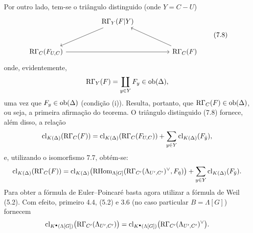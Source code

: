 Por outro lado, tem-se o triângulo distinguido (onde $Y=C-U$)
\[
\begin{tikzcd}[column sep=huge,row sep=large]
& \RG_Y(F|Y) \arrow[dl] & \\
\RG_C(F_{U,C}) \arrow[rr] && \RG_C(F) \arrow[ul]
\end{tikzcd}
\tag{7.8}
\]
onde, evidentemente,
\[
\mathrm{R}\Gamma_Y(F)=\coprod_{y\in Y}F_y\in\operatorname{ob}(\Delta),
\]
uma vez que $F_y\in\operatorname{ob}(\Delta)$ (condição (i)). Resulta, portanto, que $\mathrm{R}\Gamma_C(F)\in\operatorname{ob}(\Delta)$, ou seja, a primeira afirmação do teorema. O triângulo distinguido (7.8) fornece, além disso, a relação
\[
\operatorname{cl}_{K(\Delta)}(\mathrm{R}\Gamma_C(F))
=
\operatorname{cl}_{K(\Delta)}(\mathrm{R}\Gamma_C(F_{U,C}))
+\sum_{y\in Y}\operatorname{cl}_{K(\Delta)}(F_{\bar y}),
\]
e, utilizando o isomorfismo 7.7, obtém-se:
\[
\operatorname{cl}_{K(\Delta)}(\mathrm{R}\Gamma_C(F))
=
\operatorname{cl}_{K(\Delta)}\bigl(\mathrm{RHom}_{\Lambda[G]}(\mathrm{R}\Gamma_{C'}(\Lambda_{U',C'})^\vee,F_{\bar\eta})\bigr)
+\sum_{y\in Y}\operatorname{cl}_{K(\Delta)}(F_{\bar y}).
\]
Para obter a fórmula de Euler--Poincaré basta agora utilizar a fórmula de Weil (5.2). Com efeito, primeiro 4.4, (5.2) e 3.6 (no caso particular $B=\Lambda[G]$) fornecem
\[
\operatorname{cl}_{K^{\bullet}(\Lambda[G])}\bigl(\mathrm{R}\Gamma_{C'}(\Lambda_{U',C'})\bigr)
=
\operatorname{cl}_{K^{\bullet}(\Lambda[G])}\bigl(\mathrm{R}\Gamma_{C'}(\Lambda_{U',C'})^\vee\bigr).
\]
